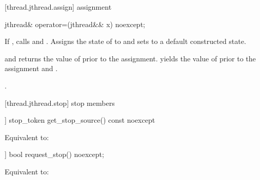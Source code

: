 [thread.jthread.assign]{ assignment}

%
\begin{itemdecl}
jthread& operator=(jthread&& x) noexcept;
\end{itemdecl}

\begin{itemdescr}
\pnum
\effects If , calls  and .
Assigns the
state of  to  and sets  to a default constructed state.

{\color{diffcolor}
\pnum
\postconditions {} and  returns the value of
 prior to the assignment.
 yields the value of  prior to the assignment
and .
}%

\pnum
\returns {}.
\end{itemdescr}


[thread.jthread.stop]{ stop members}

{\color{diffcolor}
%
\begin{itemdecl}
[[nodiscard]] stop_token get_stop_source() const noexcept
\end{itemdecl}
\begin{itemdescr}
  \pnum\effects Equivalent to: 
\end{itemdescr}

%
\begin{itemdecl}
[[nodiscard]] bool request_stop() noexcept;
\end{itemdecl}
\begin{itemdescr}
  \pnum\effects Equivalent to: 
\end{itemdescr}
}%

%
%
%


